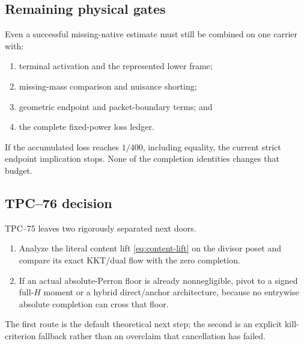 \subsection{Remaining physical gates}

Even a successful missing-native estimate must still be combined on one
carrier with:
\begin{enumerate}[label=\textup{(\roman*)},leftmargin=2.7em]
 \item terminal activation and the represented lower frame;
 \item missing-mass comparison and nuisance shorting;
 \item geometric endpoint and packet-boundary terms; and
 \item the complete fixed-power loss ledger.
\end{enumerate}
If the accumulated loss reaches \(1/400\), including equality, the
current strict endpoint implication stops.  None of the completion
identities changes that budget.

\subsection{TPC--76 decision}

TPC--75 leaves two rigorously separated next doors.
\begin{enumerate}[label=\textup{(\alph*)},leftmargin=2.6em]
 \item Analyze the literal content lift
       \eqref{eq:content-lift} on the divisor poset and compare its exact
       KKT/dual flow with the zero completion.
 \item If an actual absolute-Perron floor is already nonnegligible, pivot
       to a signed full-\(H\) moment or a hybrid direct/anchor
       architecture, because no entrywise absolute completion can cross
       that floor.
\end{enumerate}
The first route is the default theoretical next step; the second is an
explicit kill-criterion fallback rather than an overclaim that
cancellation has failed.
